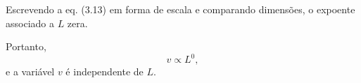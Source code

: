 Escrevendo a eq. (3.13) em forma de escala e comparando dimensões, o expoente associado a $L$ zera.

Portanto,
\[
v \propto L^0,
\]
e a variável $v$ é independente de $L$.

